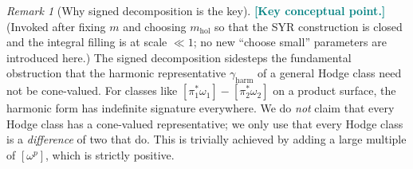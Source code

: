 \documentclass[11pt]{article}
\newcommand{\REVMZ}[1]{\textcolor{teal}{#1}}  %
\numberwithin{equation}{section}  %
\theoremstyle{plain}
\theoremstyle{definition}
\theoremstyle{remark}
\newtheorem{remark}[theorem]{Remark}
\newcommand{\mhol}{m_{\mathrm{hol}}} %
\begin{document}
\begin{remark}[Why signed decomposition is the key]
\REVMZ{\textbf{[Key conceptual point.]}}
(Invoked after fixing $m$ and choosing $\mhol$ so that the SYR construction is closed and the integral filling is at scale $\ll 1$; no new ``choose small'' parameters are introduced here.)
The signed decomposition sidesteps the fundamental obstruction that the
harmonic representative $\gamma_{\mathrm{harm}}$ of a general Hodge class
need not be cone-valued.  For classes like $[\pi_1^*\omega_1] - [\pi_2^*\omega_2]$
on a product surface, the harmonic form has indefinite signature everywhere.
We do \emph{not} claim that every Hodge class has a cone-valued representative;
we only use that every Hodge class is a \emph{difference} of two that do.
This is trivially achieved by adding a large multiple of $[\omega^p]$, which
is strictly positive.
\end{remark}






\end{document}
